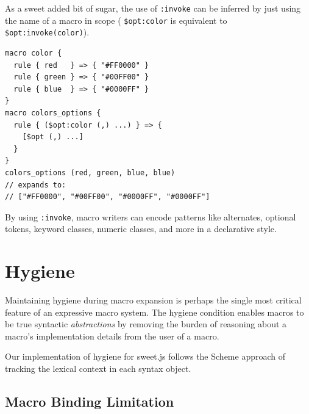 \documentclass[preprint,10pt]{sigplanconf}
\begin{document}
As a sweet added bit of sugar, the use of \verb!:invoke! can be
inferred by just using the name of a macro in scope (\ie
\verb!$opt:color! is equivalent to
\verb!$opt:invoke(color)!).

\begin{lstlisting}
macro color {
  rule { red   } => { "#FF0000" }
  rule { green } => { "#00FF00" }
  rule { blue  } => { "#0000FF" }
}
macro colors_options {
  rule { ($opt:color (,) ...) } => { 
    [$opt (,) ...]
  }
}
colors_options (red, green, blue, blue)
// expands to:
// ["#FF0000", "#00FF00", "#0000FF", "#0000FF"]
\end{lstlisting}

By using \verb!:invoke!, macro writers can encode patterns
like alternates, optional tokens, keyword classes, numeric classes,
and more in a declarative style.





\section{Hygiene}
\label{sec:hygiene}

Maintaining hygiene during macro expansion is perhaps the single most
critical feature of an expressive macro system. The hygiene condition
enables macros to be true syntactic \emph{abstractions} by removing
the burden of reasoning about a macro's implementation details from the
user of a macro.

Our implementation of hygiene for sweet.js follows the Scheme approach
\cite{Hieb1992,Flatt2012} of tracking the lexical context in each
syntax object.

\subsection{Macro Binding Limitation} 
\label{sec:macroBinding}
\end{document}
